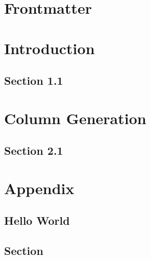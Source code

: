 \documentclass[10pt, a4paper, fontset=none, no-math]{ctexbook}
\begin{document}
\frontmatter

\chapter{Frontmatter}
\lipsum[5-10]

\mainmatter

\chapter{Introduction}

\section{Section 1.1}

\lipsum[5-10]

\chapter{Column Generation}

\lipsum[5-10]

\section{Section 2.1}

\lipsum[5-10]

\backmatter

\chapter*{Appendix}

\lipsum[5-10]

\section*{Hello World}

\lipsum[10-20]

\section{Section}

\lipsum[5-10]


% 
\end{document}
